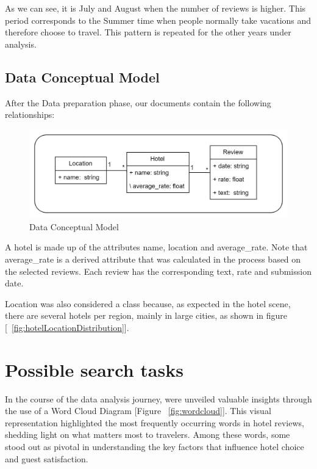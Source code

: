 \documentclass[sigconf]{acmart}
\begin{document}
As we can see, it is July and August when the number of reviews is higher. This period corresponds to the Summer time when people normally take vacations and therefore choose to travel. This pattern is repeated for the other years under analysis.

\subsection{Data Conceptual Model}

After the Data preparation phase, our documents contain the following relationships:

\begin{figure}[H]
  \centering
  \includegraphics[width=\linewidth]{imgs/UML.png}
  \caption{Data Conceptual Model}
  \label{fig:uml}
\end{figure}

A hotel is made up of the attributes name, location and average\_rate. Note that average\_rate is a derived attribute that was calculated in the process based on the selected reviews. Each review has the corresponding text, rate and submission date.

Location was also considered a class because, as expected in the hotel scene, there are several hotels per region, mainly in large cities, as shown in figure [~\ref{fig:hotelLocationDistribution}].


\section{Possible search tasks}

In the course of the data analysis journey, were unveiled valuable insights through the use of a Word Cloud Diagram [Figure ~\ref{fig:wordcloud}]. This visual representation highlighted the most frequently occurring words in hotel reviews, shedding light on what matters most to travelers. Among these words, some stood out as pivotal in understanding the key factors that influence hotel choice and guest satisfaction.
\end{document}
